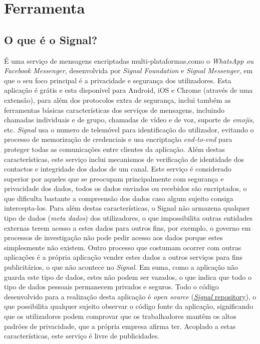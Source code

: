\section{Ferramenta}

\vspace{-0.1cm}
\subsection{O que é o Signal?}
\label{sec:signal}

É uma serviço de mensagens encriptadas multi-plataformas,como o \textit{WhatsApp ou Facebook Messenger}, desenvolvida por \textit{Signal Foundation} e \textit{Signal Messenger}, em que o seu foco principal é a privacidade e segurança dos utilizadores.
Esta aplicação é grátis e esta disponível para  Android, iOS e Chrome (através de uma extensão),
para além dos protocolos extra de segurança, inclui também as ferramentas básicas características dos serviços de mensagens, incluindo chamadas individuais e de grupo, chamadas de vídeo e de voz, suporte de \textit{emojis}, etc.\newline
\textit{Signal} usa o numero de telemóvel para identificação do utilizador, evitando o processo de memorização de credenciais e usa encriptação \textit{end-to-end} para proteger todas as comunicações entre clientes da aplicação.\newline
Além destas características, este serviço inclui mecanismos de verificação de identidade dos contactos e integridade dos dados de um canal.\newline
Este serviço é considerado superior por aqueles que se preocupam principalmente com segurança e privacidade dos dados, todos os dados enviados ou recebidos são encriptados, o que dificulta bastante a compreensão dos dados caso algum sujeito consiga intercepta-los.
Para além destas características, o Signal não armazena qualquer tipo de dados (\textit{meta dados}) dos utilizadores, o que impossibilita outras entidades externas terem acesso a estes dados para outros fins, por exemplo, o governo em processos de investigação não pode pedir acesso aos dados porque estes simplesmente não existem. Outro processo que costumam ocorrer com outras aplicações é a própria aplicação vender estes dados a outros serviços para fins publicitários, o que não acontece no \textit{Signal}. Em suma, como a aplicação não guarda este tipo de dados, estes não podem ser vazados, o que indica que todo o tipo de dados pessoais permanecem privados e seguros.\newline
Todo o código desenvolvido para a realização desta aplicação é \textit{open source} (\hyperlink{https://github.com/signalapp}{\textit{Signal} repository}), o que possibilita qualquer sujeito observar o código fonte da aplicação, significando que os utilizadores podem comprovar que os trabalhadores mantêm os altos padrões de privacidade, que a própria empresa afirma ter. Acoplado a estas características, este serviço é livre de publicidades. \cite{signal_wikipedia} \cite{signal_popular}

